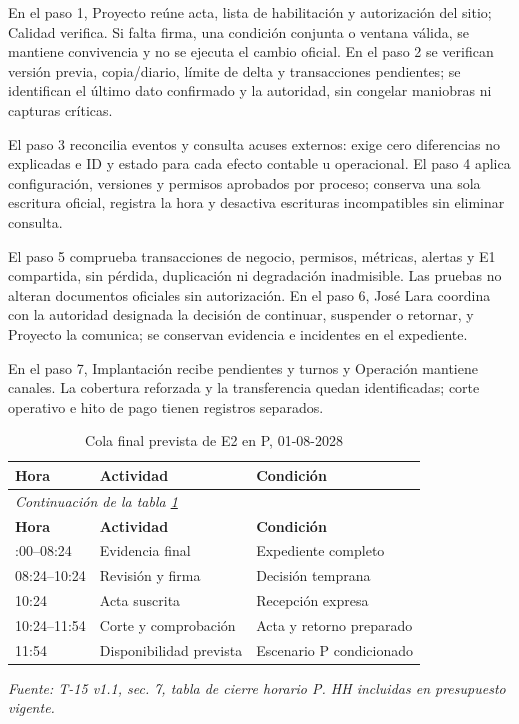 En el paso 1, Proyecto reúne acta, lista de habilitación y autorización del sitio; Calidad verifica. Si falta firma, una condición conjunta o ventana válida, se mantiene convivencia y no se ejecuta el cambio oficial. En el paso 2 se verifican versión previa, copia/diario, límite de delta y transacciones pendientes; se identifican el último dato confirmado y la autoridad, sin congelar maniobras ni capturas críticas.

El paso 3 reconcilia eventos y consulta acuses externos: exige cero diferencias no explicadas e ID y estado para cada efecto contable u operacional. El paso 4 aplica configuración, versiones y permisos aprobados por proceso; conserva una sola escritura oficial, registra la hora y desactiva escrituras incompatibles sin eliminar consulta.

El paso 5 comprueba transacciones de negocio, permisos, métricas, alertas y E1 compartida, sin pérdida, duplicación ni degradación inadmisible. Las pruebas no alteran documentos oficiales sin autorización. En el paso 6, José Lara coordina con la autoridad designada la decisión de continuar, suspender o retornar, y Proyecto la comunica; se conservan evidencia e incidentes en el expediente.

En el paso 7, Implantación recibe pendientes y turnos y Operación mantiene canales. La cobertura reforzada y la transferencia quedan identificadas; corte operativo e hito de pago tienen registros separados.


\begingroup\small\setlength{\tabcolsep}{3pt}
\begin{longtable}{p{}p{}p{}}
\caption{Cola final prevista de E2 en P, 01-08-2028}\label{tab:t18-cierre-horario}\\\hline
\textbf{Hora} & \textbf{Actividad} & \textbf{Condición}\\\hline\endfirsthead
\multicolumn{3}{l}{\textit{Continuación de la tabla \ref{tab:t18-cierre-horario}}}\\\hline
\textbf{Hora} & \textbf{Actividad} & \textbf{Condición}\\\hline\endhead
\hline\endfoot\hline\endlastfoot
08:00--08:24 & Evidencia final & Expediente completo\\\hline
08:24--10:24 & Revisión y firma & Decisión temprana\\\hline
10:24 & Acta suscrita & Recepción expresa\\\hline
10:24--11:54 & Corte y comprobación & Acta y retorno preparado\\\hline
11:54 & Disponibilidad prevista & Escenario P condicionado\\\hline
\end{longtable}\endgroup
\noindent\textit{Fuente: T-15 v1.1, sec. 7, tabla de cierre horario P. HH incluidas en presupuesto vigente.}

